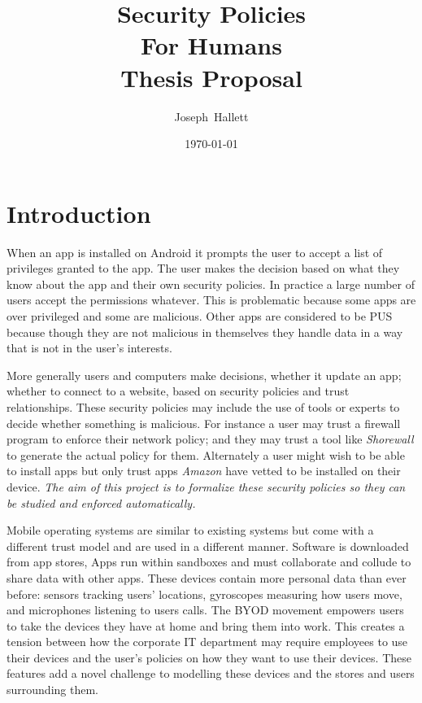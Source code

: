 \documentclass[a4paper,sfsidenotes]{tufte-book}
\title{Security Policies\\For Humans\\Thesis Proposal}
\author{Joseph~Hallett}
\date\today
\begin{document}
\maketitle
\setcounter{tocdepth}{3}
\tableofcontents
\pagebreak

\section{Introduction}

When an app is installed on Android it prompts the user to accept a list of
privileges granted to the app.  The user makes the decision based on what they
know about the app and their own security policies.  In practice a large number
of users accept the permissions whatever.  This is problematic because some apps
are over privileged\cite{Felt:2011kj} and some are malicious\cite{Zhou:2012cf}.
Other apps are considered to be \ac{PUS} because though they are not malicious
in themselves they handle data in a way that is not in the user's interests.

More generally users and computers make decisions, whether it update an app;
whether to connect to a website, based on security policies and trust
relationships.  These security policies may include the use of tools or experts
to decide whether something is malicious.  For instance a user may trust a
firewall program to enforce their network policy; and they may trust a tool like
\emph{Shorewall} to generate the actual policy for them.  Alternately a user
might wish to be able to install apps but only trust apps \emph{Amazon} have
vetted to be installed on their device.  \emph{The aim of this project is to
  formalize these security policies so they can be studied and enforced
  automatically.}

Mobile operating systems are similar to existing systems but come with a
different trust model and are used in a different manner.  Software is
downloaded from app stores, Apps run within sandboxes and must collaborate and
collude to share data with other apps. These devices contain more personal data
than ever before: sensors tracking users' locations,  gyroscopes measuring how
users move, and microphones listening to users calls.  The \ac{BYOD} movement
empowers users to take the devices they have at home and bring them into work.
This creates a tension between how the corporate IT department may require
employees to use their devices and the user's policies on how they want to use
their devices.  These features add a novel challenge to modelling these devices
and the stores and users surrounding them.  
\end{document}
